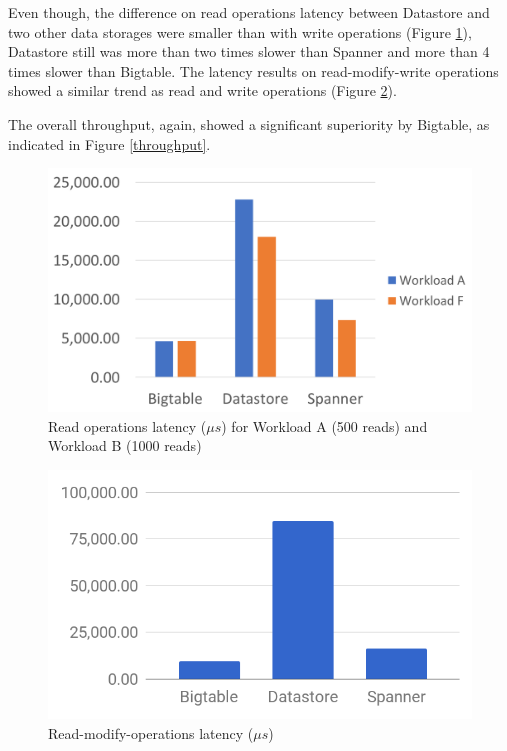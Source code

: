 \documentclass[bsc,frontabs,twoside,singlespacing,parskip,deptreport]{infthesis}     %
\begin{document}
Even though, the difference on read operations latency between Datastore and two other data storages were smaller than with write operations (Figure \ref{read-latency}), Datastore still was more than two times slower than Spanner and more than 4 times slower than Bigtable. The latency results on read-modify-write operations showed a similar trend as read and write operations (Figure \ref{read-modify-write-latency}). 

The overall throughput, again, showed a significant superiority by Bigtable, as indicated in Figure \ref{throughput}. 


\begin{figure}[ht]
	\centering
	\includegraphics[width=12cm]{read-latency}
	\caption{Read operations latency (\( \mu s\)) for Workload A (500 reads) and Workload B (1000 reads)}
	\label{read-latency}
\end{figure}

\begin{figure}[ht]
	\centering
	\includegraphics[width=13cm]{read-modify-write-latency}
	\caption{Read-modify-operations latency (\( \mu s\))}
	\label{read-modify-write-latency}
\end{figure}
\end{document}
